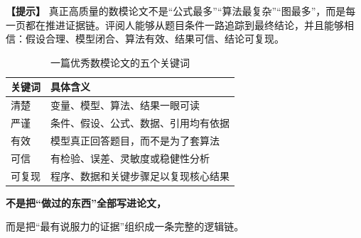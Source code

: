 \documentclass[12pt,a4paper]{article}
\newcommand{\tip}[1]{\par\noindent\textbf{【提示】} #1\par}
\begin{document}
 

\tip{真正高质量的数模论文不是“公式最多”“算法最复杂”“图最多”，而是每一页都在推进证据链。评阅人能够从题目条件一路追踪到最终结论，并且能够相信：假设合理、模型闭合、算法有效、结果可信、结论可复现。}

\begin{table}[H]
\centering
\caption{一篇优秀数模论文的五个关键词}
\begin{tabular}{p{3cm}p{10cm}}
\toprule
关键词 & 具体含义 \\
\midrule
清楚 & 变量、模型、算法、结果一眼可读 \\
严谨 & 条件、假设、公式、数据、引用均有依据 \\
有效 & 模型真正回答题目，而不是为了套算法 \\
可信 & 有检验、误差、灵敏度或稳健性分析 \\
可复现 & 程序、数据和关键步骤足以复现核心结果 \\
\bottomrule
\end{tabular}
\end{table}

\begin{center}
\vspace{2ex}
\Large\bfseries
不是把“做过的东西”全部写进论文，\par
而是把“最有说服力的证据”组织成一条完整的逻辑链。
\end{center}
\end{document}
